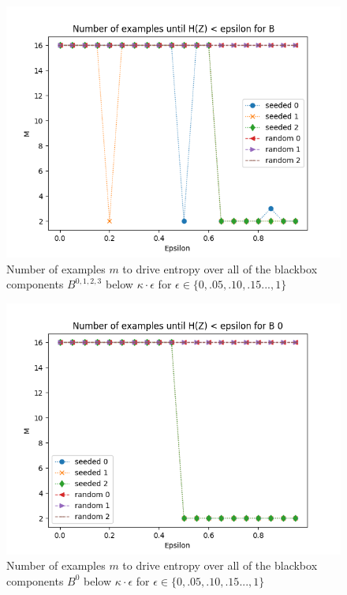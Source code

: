 \documentclass[letterpaper,twocolumn,10pt]{article}
\begin{document}
\begin{figure}
\begin{centering}
\includegraphics[width=\linewidth]{figs/thm1_allbs.png}
\end{centering}
\caption{\label{fig:thm1} Number of examples $m$ to drive entropy over all of the blackbox components $B^{0,1,2,3}$ below $\kappa \cdot \epsilon$ for $\epsilon \in \{0, .05, .10, .15...,1\}$}
\end{figure}

\begin{figure}
\begin{centering}
\includegraphics[width=\linewidth]{figs/seeded_0.png}
\end{centering}
\caption{\label{fig:b0} Number of examples $m$ to drive entropy over all of the blackbox components $B^{0}$ below $\kappa \cdot \epsilon$ for $\epsilon \in \{0, .05, .10, .15...,1\}$ }
\end{figure}
\end{document}

